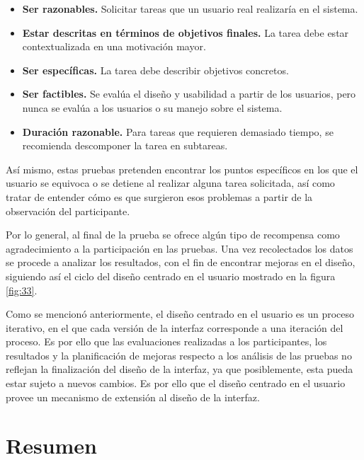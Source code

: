 \begin{itemize}
  \item \textbf{Ser razonables.} Solicitar tareas que un usuario real realizaría en el sistema.
  \item \textbf{Estar descritas en términos de objetivos finales.} La tarea debe estar contextualizada en una motivación mayor.
  \item \textbf{Ser específicas.} La tarea debe describir objetivos concretos.
  \item \textbf{Ser factibles.} Se evalúa el diseño y usabilidad a partir de los usuarios, pero nunca se evalúa a los usuarios o su manejo sobre el sistema.
  \item \textbf{Duración razonable.} Para tareas que requieren demasiado tiempo, se recomienda descomponer la tarea en subtareas.
\end{itemize}

Así mismo, estas pruebas pretenden encontrar los puntos específicos en los que el usuario se equivoca o se detiene al realizar alguna tarea solicitada, así como tratar de entender cómo es que surgieron esos problemas a partir de la observación del participante.

Por lo general, al final de la prueba se ofrece algún tipo de recompensa como agradecimiento a la participación en las pruebas. Una vez recolectados los datos se procede a analizar los resultados, con el fin de encontrar mejoras en el diseño, siguiendo así el ciclo del diseño centrado en el usuario mostrado en la figura \ref{fig:33}.

Como se mencionó anteriormente, el diseño centrado en el usuario es un proceso iterativo, en el que cada versión de la interfaz corresponde a una iteración del proceso. Es por ello que las evaluaciones realizadas a los participantes, los resultados y la planificación de mejoras respecto a los análisis de las pruebas no reflejan la finalización del diseño de la interfaz, ya que posiblemente, esta pueda estar sujeto a nuevos cambios. Es por ello que el diseño centrado en el usuario provee un mecanismo de extensión al diseño de la interfaz.


\section{Resumen}
\label{ResumenCap3}

